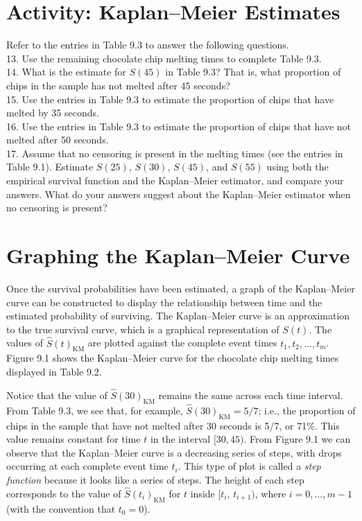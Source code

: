 \documentclass[
]{report}
\begin{document}
\section*{Activity: Kaplan--Meier Estimates}\label{activity-kaplanmeier-estimates}

Refer to the entries in Table 9.3 to answer the following questions.\\
13. Use the remaining chocolate chip melting times to complete Table 9.3.\\
14. What is the estimate for \(S(45)\) in Table 9.3? That is, what proportion of chips in the sample has not melted after 45 seconds?\\
15. Use the entries in Table 9.3 to estimate the proportion of chips that have melted by 35 seconds.\\
16. Use the entries in Table 9.3 to estimate the proportion of chips that have not melted after 50 seconds.\\
17. Assume that no censoring is present in the melting times (see the entries in Table 9.1). Estimate \(S(25)\), \(S(30)\), \(S(45)\), and \(S(55)\) using both the empirical survival function and the Kaplan--Meier estimator, and compare your answers. What do your answers suggest about the Kaplan--Meier estimator when no censoring is present?

\section*{Graphing the Kaplan--Meier Curve}\label{graphing-the-kaplanmeier-curve}

Once the survival probabilities have been estimated, a graph of the Kaplan--Meier curve can be constructed to display the relationship between time and the estimated probability of surviving. The Kaplan--Meier curve is an approximation to the true survival curve, which is a graphical representation of \(S(t)\). The values of \(\hat S(t)_{\mathrm{KM}}\) are plotted against the complete event times \(t_1, t_2, \dots, t_m\). Figure 9.1 shows the Kaplan--Meier curve for the chocolate chip melting times displayed in Table 9.2.

Notice that the value of \(\hat S(30)_{\mathrm{KM}}\) remains the same across each time interval. From Table 9.3, we see that, for example, \(\hat S(30)_{\mathrm{KM}} = 5/7\); i.e., the proportion of chips in the sample that have not melted after 30 seconds is 5/7, or 71\%. This value remains constant for time \(t\) in the interval \([30,45)\). From Figure 9.1 we can observe that the Kaplan--Meier curve is a decreasing series of steps, with drops occurring at each complete event time \(t_i\). This type of plot is called a \emph{step function} because it looks like a series of steps. The height of each step corresponds to the value of \(\hat S(t_i)_{\mathrm{KM}}\) for \(t\) inside \([t_i,\,t_{i+1})\), where \(i = 0,\dots,m-1\) (with the convention that \(t_0 = 0\)).
\end{document}
